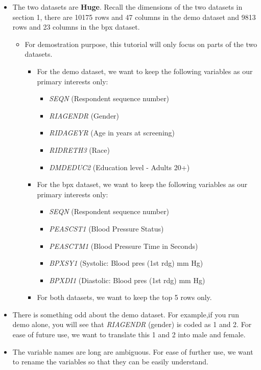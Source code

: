 \documentclass[
]{book}
\providecommand{\tightlist}{%
  \setlength{\itemsep}{0pt}\setlength{\parskip}{0pt}}
\begin{document}
\begin{itemize}
\item
  The two datasets are \textbf{Huge}. Recall the dimensions of the two datasets in section 1, there are 10175 rows and 47 columns in the demo dataset and 9813 rows and 23 columns in the bpx dataset.

  \begin{itemize}
  \item
    For demostration purpose, this tutorial will only focus on parts of the two datasets.

    \begin{itemize}
    \item
      For the demo dataset, we want to keep the following variables as our primary interests only:

      \begin{itemize}
      \tightlist
      \item
        \emph{SEQN} (Respondent sequence number)
      \item
        \emph{RIAGENDR} (Gender)
      \item
        \emph{RIDAGEYR} (Age in years at screening)
      \item
        \emph{RIDRETH3} (Race)
      \item
        \emph{DMDEDUC2} (Education level - Adults 20+)
      \end{itemize}
    \item
      For the bpx dataset, we want to keep the following variables as our primary interests only:

      \begin{itemize}
      \tightlist
      \item
        \emph{SEQN} (Respondent sequence number)
      \item
        \emph{PEASCST1} (Blood Pressure Status)
      \item
        \emph{PEASCTM1} (Blood Pressure Time in Seconds)
      \item
        \emph{BPXSY1} (Systolic: Blood pres (1st rdg) mm Hg)
      \item
        \emph{BPXDI1} (Diastolic: Blood pres (1st rdg) mm Hg)
      \end{itemize}
    \item
      For both datasets, we want to keep the top 5 rows only.
    \end{itemize}
  \end{itemize}
\item
  There is something odd about the demo dataset. For example,if you run demo alone, you will see that \emph{RIAGENDR} (gender) is coded as 1 and 2. For ease of future use, we want to translate this 1 and 2 into male and female.
\item
  The variable names are long are ambiguous. For ease of further use, we want to rename the variables so that they can be easily understand.


\end{itemize}
\end{document}
